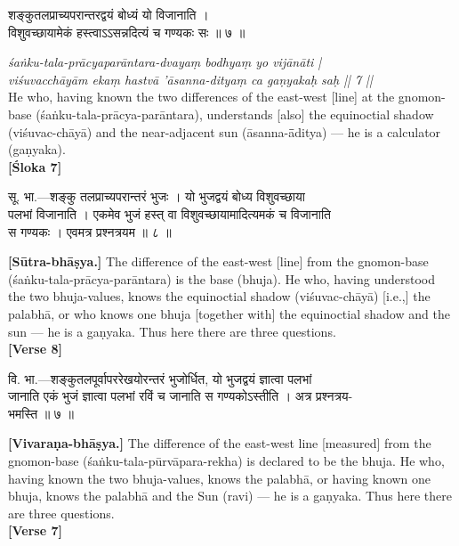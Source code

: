 \documentclass[11pt,a4paper]{article}
\newcommand{\dev}[1]{{\devanagarifont #1}}
\newcommand{\bilingualpair}[2]{%
  \noindent%
  \begin{minipage}[t]{0.48\textwidth}
    #1%
  \end{minipage}%
  \hfill%
  \begin{minipage}[t]{0.48\textwidth}
    #2%
  \end{minipage}%
  \par\vspace{0.5em}%
}
\newenvironment{sanskritcol}{\devanagarifont\small}{}
\newenvironment{englishcol}{\iastfont\small}{}
\begin{document}
\vspace{0.3cm}
\bilingualpair{%
\begin{sanskritcol}
\dev{शङ्कुतलप्राच्यपरान्तरद्वयं बोध्यं यो विजानाति ।}\\[0.3em]
\dev{विशुवच्छायामेकं हस्त्वाऽऽसन्नदित्यं च गण्यकः सः ॥ ७ ॥}
\end{sanskritcol}%
}{%
\begin{englishcol}
\textit{\'saṅku-tala-prācyaparāntara-dvayaṃ bodhyaṃ yo vijānāti |}\\[0.3em]
\textit{vi\'suvacchāyām ekaṃ hastvā '\=asanna-dityaṃ ca gaṇyakaḥ saḥ || 7 ||}\\[0.3em]
He who, having known the two differences of the east-\-west [line] at the gnomon-\-base (\'saṅku-tala-prācya-parāntara), understands [also] the equinoctial shadow (vi\'suvac-chāyā) and the near-\-adjacent sun (\=asanna-\=āditya) --- he is a calculator (gaṇyaka).\\[0.3em]
\hfill \textbf{[Śloka 7]}
\end{englishcol}%
}

\vspace{0.3cm}
\bilingualpair{%
\begin{sanskritcol}
\dev{सू. भा.---शङ्कु तलप्राच्यपरान्तरं भुजः । यो भुजद्वयं बोध्य विशुवच्छाया}\\[0.3em]
\dev{पलभां विजानाति । एकमेव भुजं हस्त् वा विशुवच्छायामादित्यमकं च विजानाति}\\[0.3em]
\dev{स गण्यकः । एवमत्र प्रश्नत्रयम ॥ ८ ॥}
\end{sanskritcol}%
}{%
\begin{englishcol}
\textbf{[Sūtra-bhāṣya.]} The difference of the east-\-west [line] from the gnomon-\-base (\'saṅku-tala-prācya-parāntara) is the base (bhuja). He who, having understood the two bhuja-\-values, knows the equinoctial shadow (vi\'suvac-chāyā) [i.e.,] the palabhā, or who knows one bhuja [together with] the equinoctial shadow and the sun --- he is a gaṇyaka. Thus here there are three questions.\\[0.3em]
\hfill \textbf{[Verse 8]}
\end{englishcol}%
}

\vspace{0.3cm}
\bilingualpair{%
\begin{sanskritcol}
\dev{वि. भा.---शङ्कुतलपूर्वापररेखयोरन्तरं भुजोर्धित, यो भुजद्वयं ज्ञात्वा पलभां}\\[0.3em]
\dev{जानाति एकं भुजं ज्ञात्वा पलभां रविं च जानाति स गण्यकोऽस्तीति । अत्र प्रश्नत्रय-}\\[0.3em]
\dev{भमस्ति ॥ ७ ॥}
\end{sanskritcol}%
}{%
\begin{englishcol}
\textbf{[Vivaraṇa-bhāṣya.]} The difference of the east-\-west line [measured] from the gnomon-\-base (\'saṅku-tala-pūrvāpara-rekha) is declared to be the bhuja. He who, having known the two bhuja-\-values, knows the palabhā, or having known one bhuja, knows the palabhā and the Sun (ravi) --- he is a gaṇyaka. Thus here there are three questions.\\[0.3em]
\hfill \textbf{[Verse 7]}
\end{englishcol}%
}
\end{document}
